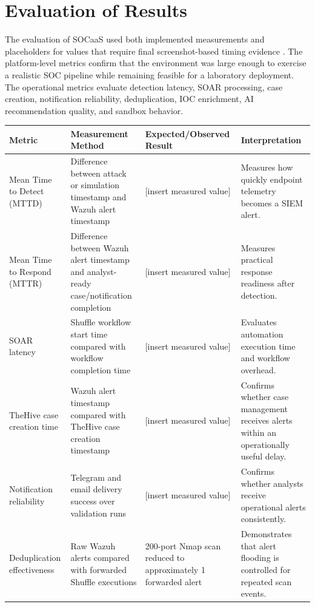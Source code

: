 \section{Evaluation of Results}
\label{sec:ch4-evaluation-of-results}

The evaluation of SOCaaS used both implemented measurements and placeholders for values that require final screenshot-based timing evidence \cite{ch4-nist-incident-guide}. The platform-level metrics confirm that the environment was large enough to exercise a realistic SOC pipeline while remaining feasible for a laboratory deployment. The operational metrics evaluate detection latency, SOAR processing, case creation, notification reliability, deduplication, IOC enrichment, AI recommendation quality, and sandbox behavior.

\begin{table}[H]
\centering
\small
\renewcommand{\arraystretch}{1.25}
\begin{tabularx}{\textwidth}{|X|X|X|X|}
\hline
\textbf{Metric} & \textbf{Measurement Method} & \textbf{Expected/Observed Result} & \textbf{Interpretation} \\
\hline
Mean Time to Detect (MTTD) & Difference between attack or simulation timestamp and Wazuh alert timestamp & [insert measured value] & Measures how quickly endpoint telemetry becomes a SIEM alert. \\
\hline
Mean Time to Respond (MTTR) & Difference between Wazuh alert timestamp and analyst-ready case/notification completion & [insert measured value] & Measures practical response readiness after detection. \\
\hline
SOAR latency & Shuffle workflow start time compared with workflow completion time & [insert measured value] & Evaluates automation execution time and workflow overhead. \\
\hline
TheHive case creation time & Wazuh alert timestamp compared with TheHive case creation timestamp & [insert measured value] & Confirms whether case management receives alerts within an operationally useful delay. \\
\hline
Notification reliability & Telegram and email delivery success over validation runs & [insert measured value] & Confirms whether analysts receive operational alerts consistently. \\
\hline
Deduplication effectiveness & Raw Wazuh alerts compared with forwarded Shuffle executions & 200-port Nmap scan reduced to approximately 1 forwarded alert & Demonstrates that alert flooding is controlled for repeated scan events. \\

\end{tabularx}
\end{table}
